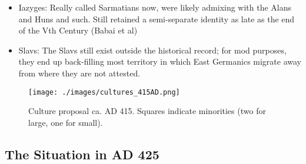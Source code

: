 \documentclass{article}
\begin{document}
\begin{itemize}
		\item Iazyges:\newline
		Really called Sarmatians now, were likely admixing with the Alans and Huns and such.
		Still retained a semi-separate identity as late as the end of the Vth Century (Babai et al)
		
		\item Slavs:\newline
		The Slavs still exist outside the historical record; for mod purposes, they end up back-filling most territory in which East Germanics migrate away from where they are not attested.
	\end{itemize}
	
	\begin{figure}[h!]
		\centering
		\texttt{[image: ./images/cultures\_415AD.png]}
		\caption{Culture proposal ca. AD 415. Squares indicate minorities (two for large, one for small).}
	\end{figure}
	
	\newpage
	\subsection{The Situation in AD 425}
	\label{sec:timeline:subsec:425}
	
\end{document}
